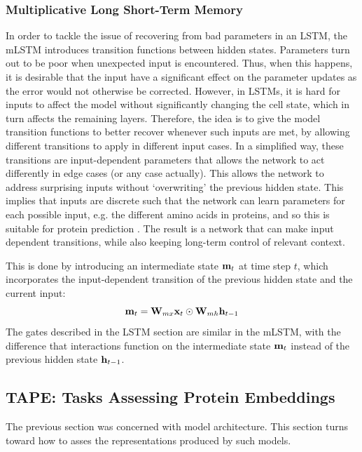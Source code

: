\documentclass[a4paper,12pt]{article}
\begin{document}
\subsubsection{Multiplicative Long Short-Term Memory}
In order to tackle the issue of recovering from bad parameters in an LSTM, the mLSTM introduces transition functions between hidden states. Parameters turn out to be poor when unexpected input is encountered. Thus, when this happens, it is desirable that the input have a significant effect on the parameter updates as the error would not otherwise be corrected. However, in LSTMs, it is hard for inputs to affect the model without significantly changing the cell state, which in turn affects the remaining layers. Therefore, the idea is to give the model transition functions to better recover whenever such inputs are met, by allowing different transitions to apply in different input cases. In a simplified way, these transitions are input-dependent parameters that allows the network to act differently in edge cases (or any case actually). This allows the network to address surprising inputs without `overwriting' the previous hidden state. This implies that inputs are discrete such that the network can learn parameters for each possible input, e.g. the different amino acids in proteins, and so this is suitable for protein prediction \cite{krause2016multiplicative}. The result is a network that can make input dependent transitions, while also keeping long-term control of relevant context.

This is done by introducing an intermediate state $\mathbf{ m }_t$ at time step $t$, which incorporates the input-dependent transition of the previous hidden state and the current input:
\[ \mathbf{ m }_t = \mathbf{ W }_{mx} \mathbf{ x }_t \odot \mathbf{ W }_{mh} \mathbf{ h }_{t-1}\]
The gates described in the LSTM section are similar in the mLSTM, with the difference that interactions function on the intermediate state $\mathbf{ m }_t$ instead of the previous hidden state $\mathbf{ h }_{t-1}$. 


\subsection{TAPE: Tasks Assessing Protein Embeddings}
\label{section:tape}
The previous section was concerned with model architecture. This section turns toward how to asses the representations produced by such models. 
\end{document}
